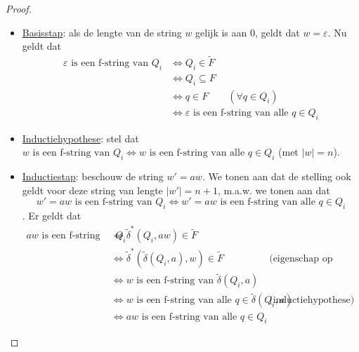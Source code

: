 \documentclass[kulak]{kulakarticle}
\let\epsilon\varepsilon
\newcommand{\abs}[1]{\lvert #1 \rvert}
\theoremstyle{definition}
\begin{document}
\begin{proof}
		\begin{itemize}
			\item \underline{Basisstap}: als de lengte van de string \(w\) gelijk is aan 0, geldt dat \(w=\epsilon\). Nu geldt dat
			\begin{equation*}
				\begin{split}
					\epsilon \text{ is een f-string van } Q_i &\Leftrightarrow Q_i \in \tilde{F} \\
					&\Leftrightarrow Q_i \subseteq F \\
					&\Leftrightarrow q \in F \qquad (\forall q \in Q_i)\\
					&\Leftrightarrow \epsilon \text{ is een f-string van alle } q \in Q_i
				\end{split}
			\end{equation*}
			\item \underline{Inductiehypothese}: stel dat \(w \text{ is een f-string van } Q_i \Leftrightarrow w \text{ is een f-string van alle } q\in Q_i \) (met \(\abs{w}=n\)).
			\item \underline{Inductiestap}: beschouw de string \(w'=aw\). We tonen aan dat de stelling ook geldt voor deze string van lengte \(\abs{w'}=n+1\), m.a.w. we tonen aan dat \[w'=aw \text{ is een f-string van } Q_i \Leftrightarrow w'=aw \text{ is een f-string van alle } q\in Q_i \]. Er geldt dat
			\begin{align*}
				aw \text{ is een f-string van } Q_i &\Leftrightarrow \tilde{\delta}^*(Q_i,aw) \in \tilde{F} \\
				&\Leftrightarrow \tilde{\delta}^*\left(\tilde{\delta}(Q_i,a),w\right) \in \tilde{F} && \text{(eigenschap op p.30)} \\
				&\Leftrightarrow w \text{ is een f-string van } \tilde{\delta}(Q_i,a)\\
				&\Leftrightarrow w \text{ is een f-string van alle } q \in \tilde{\delta}(Q_i,a) && \text{(inductiehypothese)} \\
				&\Leftrightarrow aw \text{ is een f-string van alle } q \in Q_i
			\end{align*}
		\end{itemize}
	\end{proof}
\end{document}
